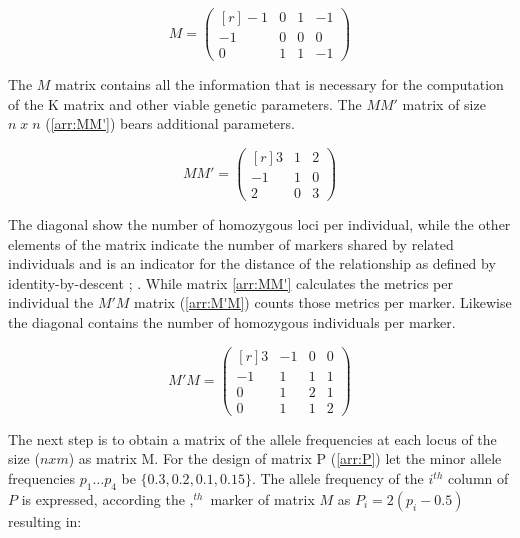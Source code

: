 \begin{equation}
  M = 
  \begin{pmatrix}[r]
    -1 & 0 &  1 & -1 \\
    -1 & 0 &  0 &  0 \\
     0 & 1 &  1 & -1 
  \end{pmatrix}
  \label{arr:M}
\end{equation}

The $M$ matrix contains all the information that is necessary for the computation of the K matrix and other viable genetic parameters. The $MM'$ matrix of size $n\; x\; n$ (\ref{arr:MM'}) bears additional parameters.

\begin{equation}
  MM' = 
  \begin{pmatrix}[r]
    3 &  1 & 2 \\
   -1 &  1 & 0 \\
    2 &  0 & 3 
  \end{pmatrix}
  \label{arr:MM'}
\end{equation}


The diagonal show the number of homozygous loci per individual, while the other elements of the matrix
indicate the number of markers shared by related individuals and is an indicator for the distance of the
relationship as defined by identity-by-descent \cite{vanraden2008efficient}; \cite{misztal2013methods}.  While
matrix \ref{arr:MM'} calculates the metrics per individual the $M'M$ matrix (\ref{arr:M'M}) counts those
metrics per marker. Likewise the diagonal contains the number of homozygous individuals per marker.

\begin{equation}
  M'M = 
  \begin{pmatrix}[r]
    3 & -1 & 0 & 0 \\
   -1 &  1 & 1 & 1 \\
    0 &  1 & 2 & 1 \\
    0 &  1 & 1 & 2 
  \end{pmatrix}
  \label{arr:M'M}
\end{equation}

The next step is to obtain a matrix of the allele frequencies at each locus of the size ($n x m$) as matrix
M. For the design of matrix P (\ref{arr:P}) let the minor allele frequencies $p_1 \dots p_4$ be
$\{0.3, 0.2, 0.1, 0.15\}$. The allele frequency of the $i^{th}$ column of $P$ is expressed, according the $,^{th}$ marker of matrix $M$ as $P_i = 2(p_i - 0.5)$ resulting in: 

